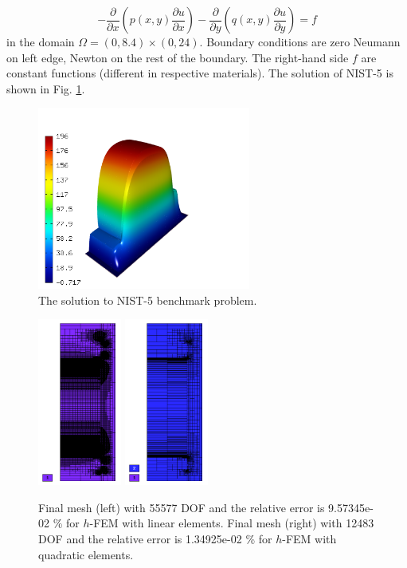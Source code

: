 \documentclass[12pt]{elsarticle}
\begin{document}
\begin{equation} \label{heat-conduction}
-\frac{\partial }{\partial x}\left(p(x, y)\frac{\partial u}{\partial x}\right)
-\frac{\partial }{\partial y}\left(q(x, y)\frac{\partial u}{\partial y}\right) = f
\end{equation}
in the domain $\Omega = (0, 8.4) \times (0, 24)$. Boundary conditions are zero Neumann on left edge, Newton on the rest of the boundary.
The right-hand side $f$ are constant functions (different in respective materials).
The solution of NIST-5 is shown in Fig. \ref{fig:sln-nist05}.

\begin{figure}[H]
\centering
\vspace{-3mm}
\includegraphics[height=6cm]{nist/nist-5/solution.png}
\vspace{-3mm}
\caption{The solution to NIST-5 benchmark problem.}
\label{fig:sln-nist05}
\end{figure}

\begin{figure}[H]
\centering
\includegraphics[height=5.5cm]{nist/nist-5/mesh_h1_aniso.png}
\includegraphics[height=5.5cm]{nist/nist-5/mesh_h2_aniso.png}
\caption{
Final mesh (left) with 55577 DOF and the relative error is 9.57345e-02 \% for $h$-FEM with linear elements.
Final mesh (right) with 12483 DOF and the relative error is 1.34925e-02 \% for $h$-FEM with quadratic elements.}
\label{fig:nist-5-h-aniso}
\end{figure}
\end{document}
